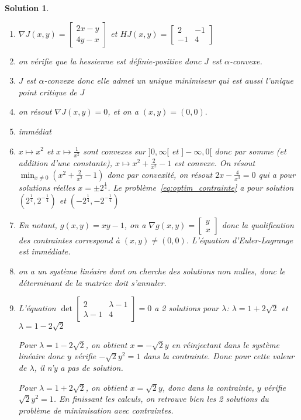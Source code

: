 \documentclass[11pt]{article}
\theoremstyle{exostyle}
\newtheorem{solution}{Solution}
\begin{document}
\begin{solution}
 \begin{enumerate}
  \item $\nabla J(x,y) = \begin{bmatrix}
  2x-y\\ 4y-x\end{bmatrix}$ et $HJ(x,y) = \begin{bmatrix}
  2 & -1 \\ -1 & 4
  \end{bmatrix}$
  \item on vérifie que la hessienne est définie-positive donc $J$ est $\alpha$-convexe.
  \item $J$ est $\alpha$-convexe donc elle admet un unique minimiseur qui est aussi l’unique point critique de $J$ 
  \item on résout $\nabla J(x,y) = 0$, et on a $(x,y) = (0,0).$
  \item immédiat
  \item $x \mapsto x^2$ et $x \mapsto \frac{1}{x^2}$ sont convexes sur $]0,\infty[$ et $]-\infty,0[$ donc par somme (et addition d’une constante), $x \mapsto x^2 + \frac{2}{x^2} -1$ est convexe. 
  On résout $\min_{x \not=0}(x^2 + \frac{2}{x^2} -1)$ donc par convexité, on résout $2x - \frac{4}{x^3}=0$ qui a pour solutions réelles $x=\pm 2^{\frac{1}{4}}$. 
  Le problème~\eqref{eq:optim_contrainte} a pour solution $(2^{\frac{1}{4}},2^{-\frac{1}{4}})$ et $(-2^{\frac{1}{4}},-2^{-\frac{1}{4}})$
  \item En notant, $g(x,y) = xy - 1$, on a $\nabla g(x,y) = \begin{bmatrix}
  y \\ x
  \end{bmatrix}$ donc la qualification des contraintes correspond à $(x,y) \not=(0,0)$.
  L’équation d’Euler-Lagrange est immédiate.
  \item on a un système linéaire dont on cherche des solutions non nulles, donc le déterminant de la matrice doit s’annuler.
  \item L’équation $\det \begin{bmatrix}
  2 & \lambda-1 \\
  \lambda -1 & 4
  \end{bmatrix} = 0$ a 2 solutions pour $\lambda$: $\lambda = 1+2\sqrt{2}$ et $\lambda = 1-2\sqrt{2}$
  
  Pour $\lambda = 1-2\sqrt{2}$, on obtient $x=-\sqrt{2}y$ en réinjectant dans le système linéaire donc $y$ vérifie $-\sqrt{2}y^2 = 1$ dans la contrainte. Donc pour cette valeur de $\lambda$, il n’y a pas de solution.

  Pour  $\lambda = 1+2\sqrt{2}$, on obtient $x=\sqrt{2}y$, donc dans la contrainte, $y$ vérifie $\sqrt{2} y^2 = 1$. En finissant les calculs, on retrouve bien les 2 solutions du problème de minimisation avec contraintes.
 \end{enumerate} 
\end{solution}
\end{document}
